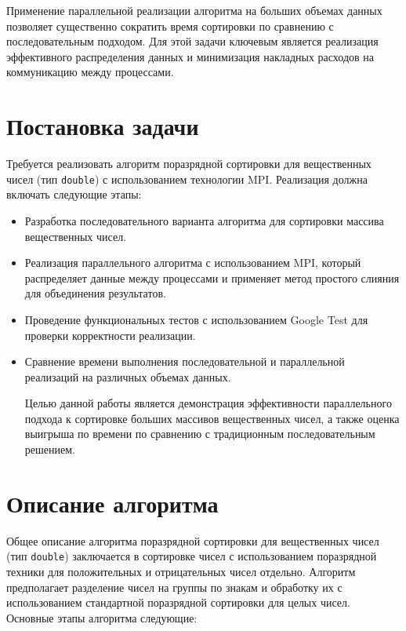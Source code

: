\documentclass[12pt]{article}
\begin{document}
Применение параллельной реализации алгоритма на больших объемах данных позволяет существенно сократить время сортировки по сравнению с последовательным подходом. Для этой задачи ключевым является реализация эффективного распределения данных и минимизация накладных расходов на коммуникацию между процессами.

\section{Постановка задачи}

\hspace*{1.25em} Требуется реализовать алгоритм поразрядной сортировки для вещественных чисел (тип \texttt{double}) с использованием технологии MPI. Реализация должна включать следующие этапы:

\begin{itemize}
    \item Разработка последовательного варианта алгоритма для сортировки массива вещественных чисел.
    \item Реализация параллельного алгоритма с использованием MPI, который распределяет данные между процессами и применяет метод простого слияния для объединения результатов.
    \item Проведение функциональных тестов с использованием Google Test для проверки корректности реализации.
    \item Сравнение времени выполнения последовательной и параллельной реализаций на различных объемах данных.

Целью данной работы является демонстрация эффективности параллельного подхода к сортировке больших массивов вещественных чисел, а также оценка выигрыша по времени по сравнению с традиционным последовательным решением.
\end{itemize}
\section{Описание алгоритма}

\hspace*{1.25em}Общее описание алгоритма поразрядной сортировки для вещественных чисел (тип \texttt{double}) заключается в сортировке чисел с использованием поразрядной техники для положительных и отрицательных чисел отдельно. Алгоритм предполагает разделение чисел на группы по знакам и обработку их с использованием стандартной поразрядной сортировки для целых чисел. Основные этапы алгоритма следующие:
\end{document}
